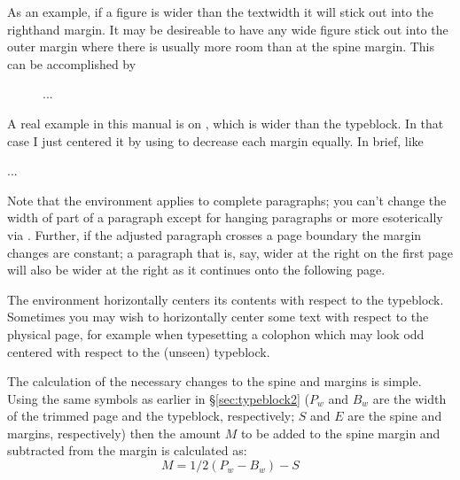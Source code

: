     As an example, if a figure is wider than the textwidth 
it will stick out into the righthand margin. It may be 
desireable to have any wide figure stick out into the 
outer margin where there is usually more room than at
the spine margin. This can be accomplished by
\begin{lcode}
\begin{figure}
\centering
\strictpagecheck
\begin{adjustwidth*}{0em}{-3em}
\caption{...}
\end{adjustwidth*}
\end{figure}
\end{lcode}

    A real example in this manual is  on ,
which is wider than the typeblock. In that case I 
just centered it by using  to decrease each 
margin equally. In brief, like
\begin{lcode}
\begin{table}
\begin{adjustwidth}{-1cm}{-1cm}
\centering
...
\end{adjustwidth}
\end{table}
\end{lcode}

    Note that the  environment applies to complete paragraphs;
you can't change the width of part of a paragraph 
except for hanging paragraphs or more esoterically 
via \cmd{\parshape}. Further, if the adjusted paragraph crosses a
page boundary the margin changes are constant; a paragraph 
that is, say, wider at the right on the first page will also be wider at 
the right as it continues onto the following page.

    The  environment horizontally centers its contents
with respect to the typeblock. 
Sometimes you may wish to horizontally center some text with respect
to the physical page, for example when typesetting a 
colophon which may look odd centered with respect
to the (unseen) typeblock.

    The calculation of the necessary changes to the spine and \foredge{}
margins is simple. Using the same symbols as earlier in 
\S\ref{sec:typeblock2} ($P_{w}$ and $B_{w}$ are the width of the trimmed 
page and the typeblock, respectively;
$S$ and $E$ are the spine and \foredge{} margins, 
respectively) then the amount $M$ to be added to the spine 
margin and subtracted from the
\foredge{} margin is calculated as:
\begin{displaymath}
 M = 1/2(P_{w} - B_{w}) - S
\end{displaymath}

